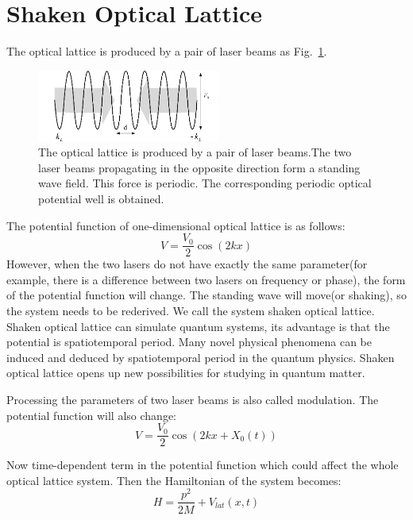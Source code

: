 \documentclass[
 reprint,
amsmath,amssymb,
aps,
pra,
floatfix,
]{revtex4-2}
\begin{document}
\section{Shaken Optical Lattice}
The optical lattice is produced by a pair of laser beams as Fig.~\ref{fig1}.
\begin{figure}
  \includegraphics[width = 6cm]{fig1.eps}
  \caption{\label{fig1} The optical lattice is produced by a pair of laser beams.The two laser beams propagating in the opposite direction form a standing wave field. 
  This force is periodic. The corresponding periodic optical potential well is obtained.}
\end{figure}
The potential function of one-dimensional optical lattice is as follows:
\begin{equation}
  V=\frac{V_{0}}{2} \cos (2 k x)
  \label{eq1}
\end{equation}
However, when the two lasers do not have exactly the same parameter(for example, there is a difference between two lasers on frequency or phase), 
the form of the potential function will change. The standing wave will move(or shaking), so the system needs to be rederived.
We call the system shaken optical lattice.
Shaken optical lattice can simulate quantum systems, its advantage is that the potential is spatiotemporal period. 
Many novel physical phenomena can be induced and deduced by spatiotemporal period in the quantum physics.
Shaken optical lattice opens up new possibilities for studying in quantum matter.\cite{clark2018observation, weidner2018experimental, zhang2017manipulating, di2011finite}

Processing the parameters of two laser beams is also called modulation. The potential function will also change:
\begin{equation}
  V=\frac{V_{0}}{2} \cos \left(2 k x+X_{0}(t)\right)
  \label{eq2}
\end{equation}

Now time-dependent term in the potential function which could affect the whole optical lattice system. 
Then the Hamiltonian of the system becomes:
\begin{equation}
  H=\frac{p^{2}}{2 M}+V_{l a t}(x, t)
  \label{eq3}
\end{equation}
\end{document}
